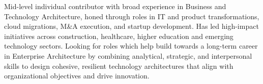

\begin{cvparagraph}

Mid-level individual contributor with broad experience in Business and Technology Architecture, honed through roles in IT and product transformations, cloud migrations, M\&A execution, and startup development. Has led high-impact initiatives across construction, healthcare, higher education and emerging technology sectors. Looking for roles which help build towards a long-term career in Enterprise Architecture by combining analytical, strategic, and interpersonal skills to design cohesive, resilient technology architectures that align with organizational objectives and drive innovation.
\end{cvparagraph}